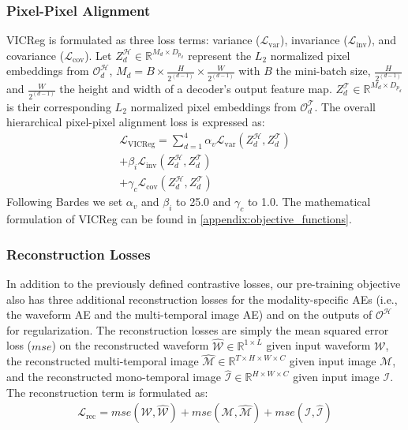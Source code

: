\subsubsection{Pixel-Pixel Alignment} VICReg is formulated as three loss terms: variance ($\mathcal{L}_{\text{var}}$), invariance ($\mathcal{L}_{\text{inv}}$), and covariance ($\mathcal{L}_{\text{cov}}$). Let \( Z^\mathcal{H}_{d} \in \mathbb{R}^{M_d\times D_{p_d}} \) represent the $L_2$ normalized pixel embeddings from \( \mathcal{O}^\mathcal{H}_d\), \( M_d = B \times \frac{H}{2^{(d-1)}} \times \frac{W}{2^{(d-1)}} \) with $B$ the mini-batch size, $\frac{H}{2^{(d-1)}}$ and $\frac{W}{2^{(d-1)}}$ the height and width of a decoder's output feature map. \( Z^\mathcal{T}_d \in \mathbb{R}^{M_d \times D_{p_d}} \) is their corresponding $L_2$ normalized pixel embeddings from \( \mathcal{O}^\mathcal{T}_d \). The overall hierarchical pixel-pixel alignment loss is expressed as:
\begin{align}
    \mathcal{L}_\text{VICReg} = \sum_{d=1}^{4} \alpha_v \mathcal{L}_{\text{var}}(Z^\mathcal{H}_{d},Z^\mathcal{T}_{d})\nonumber\\
    + \beta_i\mathcal{L}_{\text{inv}}(Z^\mathcal{H}_{d},Z^\mathcal{T}_{d}) \nonumber\\
    + \gamma_c \mathcal{L}_{\text{cov}}(Z^\mathcal{H}_{d},Z^\mathcal{T}_{d})\label{hiearchical_vicreg}
\end{align}
Following Bardes  we set $\alpha_v$ and $\beta_i$ to 25.0 and $\gamma_c$ to 1.0. The mathematical formulation of VICReg can be found in \autoref{appendix:objective_functions}.

\subsubsection{Reconstruction Losses} In addition to the previously defined contrastive losses, our pre-training objective also has three additional reconstruction losses for the modality-specific AEs (i.e., the waveform AE and the multi-temporal image AE) and on the outputs of $\mathcal{O}^{\mathcal{H}}$ for regularization. The reconstruction losses are simply the mean squared error loss ($mse$) on the reconstructed waveform $\mathcal{\hat{W}} \in \mathbb{R}^{1 \times L}$ given input waveform $\mathcal{W}$, the reconstructed multi-temporal image $\mathcal{\hat{M}} \in \mathbb{R}^{T \times H \times W \times C}$ given input image $\mathcal{M}$, and the reconstructed mono-temporal image $\mathcal{\hat{I}} \in \mathbb{R}^{H \times W \times C}$ given input image $\mathcal{I}$. The reconstruction term is formulated as:
\begin{align}
    \label{rec_losses}
    \mathcal{L}_{\text{rec}} = mse(\mathcal{W},\mathcal{\hat{W}}) + mse(\mathcal{M},\mathcal{\hat{M}}) + mse(\mathcal{I},\mathcal{\hat{I}})
\end{align}

